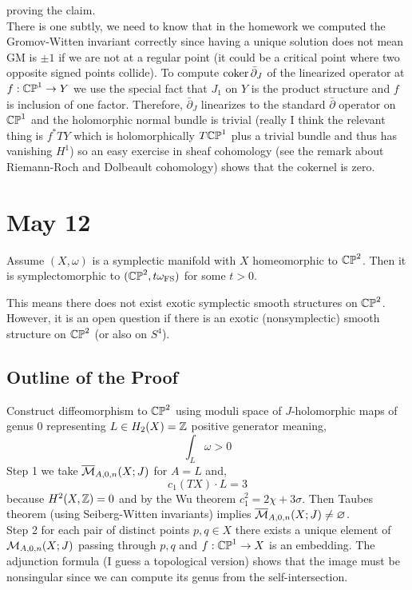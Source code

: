 \documentclass[12pt]{article}
\newcommand{\dbar}{\bar{\partial}}
\begin{document}
proving the claim.  
\bigskip\\
There is one subtly, we need to know that in the homework we computed the Gromov-Witten invariant correctly since having a unique solution does not mean GM is $\pm 1$ if we are not at a regular point (it could be a critical point where two opposite signed points collide). To compute $\coker{\dbar_J}$ of the linearized operator at $f : \mathbb{CP}^1 \to Y$ we use the special fact that $J_1$ on $Y$ is the product structure and $f$ is inclusion of one factor. Therefore, $\dbar_J$ linearizes to the standard $\dbar$ operator on $\mathbb{CP}^1$ and the holomorphic normal bundle is trivial (really I think the relevant thing is $f^* TY$ which is holomorphically $T \mathbb{CP}^1$ plus a trivial bundle and thus has vanishing $H^1$) so an easy exercise in sheaf cohomology (see the remark about Riemann-Roch and Dolbeault cohomology) shows that the cokernel is zero. 

\section{May 12}

\begin{theorem}
Assume $(X, \omega)$ is a symplectic manifold with $X$ homeomorphic to $\mathbb{CP}^2$. Then it is symplectomorphic to $(\mathbb{CP}^2, t \omega_{\text{FS}})$ for some $t > 0$.
\end{theorem}

\begin{rmk}
This means there does not exist exotic symplectic smooth structures on $\mathbb{CP}^2$. However, it is an open question if there is an exotic (nonsymplectic) smooth structure on $\mathbb{CP}^2$ (or also on $S^4$). 
\end{rmk}

\subsection{Outline of the Proof}

Construct diffeomorphism to $\mathbb{CP}^2$ using moduli space of $J$-holomorphic maps of genus $0$ representing $L \in H_2(X) = \mathbb{Z}$ positive generator meaning,
\[ \int_L \omega > 0 \]
Step 1 we take $\overline{\mathcal{M}}_{A,0,n}(X; J)$ for $A = L$ and,
\[ c_1(TX) \cdot L =3 \]
because $H^2(X, \mathbb{Z}) = 0$ and by the Wu theorem $c_1^2 = 2 \chi + 3 \sigma$. Then Taubes theorem (using Seiberg-Witten invariants) implies $\overline{\mathcal{M}}_{A,0,n}(X; J) \neq \varnothing$. 
\bigskip\\
Step 2 for each pair of distinct points $p,q \in X$ there exists a unique element of $\mathcal{M}_{A,0,n}(X; J)$ passing through $p,q$ and $f : \mathbb{CP}^1 \to X$ is an embedding. The adjunction formula (I guess a topological version) shows that the image must be nonsingular since we can compute its genus from the self-intersection.
\end{document}
